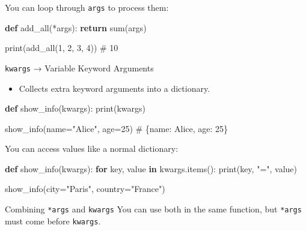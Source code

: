 \documentclass[
  letterpaper,
  DIV=11,
  numbers=noendperiod]{scrreprt}
\newenvironment{Shaded}{\begin{snugshade}}{\end{snugshade}}
\newcommand{\BuiltInTok}[1]{\textcolor[rgb]{0.00,0.23,0.31}{#1}}
\newcommand{\CommentTok}[1]{\textcolor[rgb]{0.37,0.37,0.37}{#1}}
\newcommand{\ControlFlowTok}[1]{\textcolor[rgb]{0.00,0.23,0.31}{\textbf{#1}}}
\newcommand{\DecValTok}[1]{\textcolor[rgb]{0.68,0.00,0.00}{#1}}
\newcommand{\KeywordTok}[1]{\textcolor[rgb]{0.00,0.23,0.31}{\textbf{#1}}}
\newcommand{\NormalTok}[1]{\textcolor[rgb]{0.00,0.23,0.31}{#1}}
\newcommand{\OperatorTok}[1]{\textcolor[rgb]{0.37,0.37,0.37}{#1}}
\newcommand{\StringTok}[1]{\textcolor[rgb]{0.13,0.47,0.30}{#1}}
\providecommand{\tightlist}{%
  \setlength{\itemsep}{0pt}\setlength{\parskip}{0pt}}
\begin{document}
You can loop through \texttt{args} to process them:

\begin{Shaded}
\begin{Highlighting}[]
\KeywordTok{def}\NormalTok{ add\_all(}\OperatorTok{*}\NormalTok{args):}
    \ControlFlowTok{return} \BuiltInTok{sum}\NormalTok{(args)}

\BuiltInTok{print}\NormalTok{(add\_all(}\DecValTok{1}\NormalTok{, }\DecValTok{2}\NormalTok{, }\DecValTok{3}\NormalTok{, }\DecValTok{4}\NormalTok{))   }\CommentTok{\# 10}
\end{Highlighting}
\end{Shaded}

\texttt{kwargs} → Variable Keyword Arguments

\begin{itemize}
\tightlist
\item
  Collects extra keyword arguments into a dictionary.
\end{itemize}

\begin{Shaded}
\begin{Highlighting}[]
\KeywordTok{def}\NormalTok{ show\_info(kwargs):}
    \BuiltInTok{print}\NormalTok{(kwargs)}

\NormalTok{show\_info(name}\OperatorTok{=}\StringTok{"Alice"}\NormalTok{, age}\OperatorTok{=}\DecValTok{25}\NormalTok{)}
\CommentTok{\# \{\textquotesingle{}name\textquotesingle{}: \textquotesingle{}Alice\textquotesingle{}, \textquotesingle{}age\textquotesingle{}: 25\}}
\end{Highlighting}
\end{Shaded}

You can access values like a normal dictionary:

\begin{Shaded}
\begin{Highlighting}[]
\KeywordTok{def}\NormalTok{ show\_info(kwargs):}
    \ControlFlowTok{for}\NormalTok{ key, value }\KeywordTok{in}\NormalTok{ kwargs.items():}
        \BuiltInTok{print}\NormalTok{(key, }\StringTok{"="}\NormalTok{, value)}

\NormalTok{show\_info(city}\OperatorTok{=}\StringTok{"Paris"}\NormalTok{, country}\OperatorTok{=}\StringTok{"France"}\NormalTok{)}
\end{Highlighting}
\end{Shaded}

Combining \texttt{*args} and \texttt{kwargs} You can use both in the
same function, but \texttt{*args} must come before \texttt{kwargs}.
\end{document}
